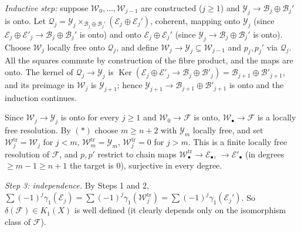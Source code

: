 \documentclass[11pt]{article}
\begin{document}
\emph{Inductive step:} suppose $\mathcal W_0,\dots,\mathcal W_{j-1}$ are constructed ($j\ge1$) and $\mathcal Y_j\to\mathcal B_j\oplus\mathcal B_j'$ is onto. Let $\mathcal Q_j=\mathcal Y_j\times_{\mathcal B_j\oplus\mathcal B_j'}(\mathcal E_j\oplus\mathcal E_j')$, coherent, mapping onto $\mathcal Y_j$ (since $\mathcal E_j\oplus\mathcal E'_j\to\mathcal B_j\oplus\mathcal B_j'$ is onto) and onto $\mathcal E_j\oplus\mathcal E_j'$ (since $\mathcal Y_j\to\mathcal B_j\oplus\mathcal B_j'$ is onto). Choose $\mathcal W_j$ locally free onto $\mathcal Q_j$, and define $\mathcal W_j\to\mathcal Y_j\subseteq\mathcal W_{j-1}$ and $p_j,p_j'$ via $\mathcal Q_j$. All the squares commute by construction of the fibre product, and the maps are onto. The kernel of $\mathcal Q_j\to\mathcal Y_j$ is $\operatorname{Ker}(\mathcal E_j\oplus\mathcal E'_j\to\mathcal B_j\oplus\mathcal B'_j)=\mathcal B_{j+1}\oplus\mathcal B'_{j+1}$, and its preimage in $\mathcal W_j$ is $\mathcal Y_{j+1}$; hence $\mathcal Y_{j+1}\to\mathcal B_{j+1}\oplus\mathcal B'_{j+1}$ is onto and the induction continues.

Since $\mathcal W_j\to\mathcal Y_j$ is onto for every $j\ge1$ and $\mathcal W_0\to\mathcal F$ is onto, $\mathcal W_\bullet\to\mathcal F$ is a locally free resolution. By $(\ast)$ choose $m\ge n+2$ with $\mathcal Y_m$ locally free, and set $\mathcal W^{\mathrm{tr}}_j=\mathcal W_j$ for $j<m$, $\mathcal W^{\mathrm{tr}}_m=\mathcal Y_m$, $\mathcal W_j^{\mathrm{tr}}=0$ for $j>m$. This is a finite locally free resolution of $\mathcal F$, and $p,p'$ restrict to chain maps $\mathcal W^{\mathrm{tr}}_\bullet\to\mathcal E_\bullet$, $\to\mathcal E'_\bullet$ (in degrees $\ge m-1\ge n+1$ the target is $0$), surjective in every degree.

\emph{Step 3: independence.} By Steps 1 and 2, $\sum(-1)^j\gamma_1(\mathcal E_j)=\sum(-1)^j\gamma_1(\mathcal W^{\mathrm{tr}}_j)=\sum(-1)^j\gamma_1(\mathcal E_j')$. So $\delta(\mathcal F)\in K_1(X)$ is well defined (it clearly depends only on the isomorphism class of $\mathcal F$).
\end{document}
